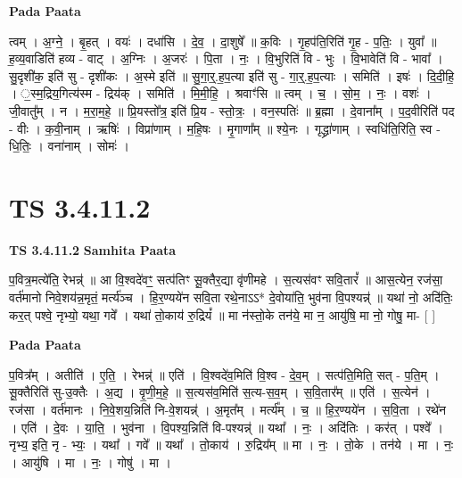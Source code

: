 \documentclass[17pt]{extarticle}
\begin{document}
\textbf{Pada Paata} \newline

त्वम् । अ॒ग्ने॒ । बृ॒हत् । वयः॑ । दधा॑सि । दे॒व॒ । दा॒शुषे᳚ ॥ क॒विः । गृ॒हप॑ति॒रिति॑ गृ॒ह - प॒तिः॒ । युवा᳚ ॥ ह॒व्य॒वाडिति॑ हव्य - वाट् । अ॒ग्निः । अ॒जरः॑ । पि॒ता । नः॒ । वि॒भुरिति॑ वि - भुः । वि॒भावेति॑ वि - भावा᳚ । सु॒दृशी॑क॒ इति॑ सु - दृशी॑कः । अ॒स्मे इति॑ ॥ सु॒गा॒र्॒.ह॒प॒त्या इति॑ सु - गा॒र्॒.ह॒प॒त्याः । समिति॑ । इषः॑ । दि॒दी॒हि॒ । ॒स्म॒द्रिय॒गित्य॑स्म - द्रिय॑क् । समिति॑ । मि॒मी॒हि॒ । श्रवाꣳ॑सि ॥ त्वम् । च॒ । सो॒म॒ । नः॒ । वशः॑ । जी॒वातु᳚म् । न । म॒रा॒म॒हे॒ ॥ प्रि॒यस्तो᳚त्र॒ इति॑ प्रि॒य - स्तो॒त्रः॒ । वन॒स्पतिः॑ ॥ ब्र॒ह्मा । दे॒वाना᳚म् । प॒द॒वीरिति॑ पद - वीः । क॒वी॒नाम् । ऋषिः॑ । विप्रा॑णाम् । म॒हि॒षः । मृ॒गाणा᳚म् ॥ श्ये॒नः । गृद्ध्रा॑णाम् । स्वधि॑ति॒रिति॒ स्व - धि॒तिः॒ । वना॑नाम् । सोमः॑ ।  \newline





\section{ TS 3.4.11.2 }

\textbf{TS 3.4.11.2 } \newline
\textbf{Samhita Paata} \newline

प॒वित्र॒मत्ये॑ति॒ रेभन्न्॑ ॥ आ वि॒श्वदे॑वꣳ॒॒ सत्प॑तिꣳ सू॒क्तैर॒द्या वृ॑णीमहे । स॒त्यस॑वꣳ सवि॒तारं᳚ ॥ आस॒त्येन॒ रज॑सा॒ वर्त॑मानो निवे॒शय॑न्न॒मृतं॒ मर्त्य॑ञ्च । हि॒र॒ण्यये॑न सवि॒ता रथे॒नाऽऽ* दे॒वोया॑ति॒ भुव॑ना वि॒पश्यन्न्॑ ॥ यथा॑ नो॒ अदि॑तिः॒ कर॒त् पश्वे॒ नृभ्यो॒ यथा॒ गवे᳚ । यथा॑ तो॒काय॑ रु॒द्रियं᳚ ॥ मा न॑स्तो॒के तन॑ये॒ मा न॒ आयु॑षि॒ मा नो॒ गोषु॒ मा- [  ] \newline

\textbf{Pada Paata} \newline

प॒वित्र᳚म् । अतीति॑ । ए॒ति॒ । रेभन्न्॑ ॥ एति॑ । वि॒श्वदे॑व॒मिति॑ वि॒श्व - दे॒व॒म् । सत्प॑ति॒मिति॒ सत् - प॒ति॒म् । सू॒क्तैरिति॑ सु-उ॒क्तैः । अ॒द्य । वृ॒णी॒म॒हे॒ ॥ स॒त्यस॑व॒मिति॑ स॒त्य-स॒व॒म् । स॒वि॒तार᳚म् ॥ एति॑ । स॒त्येन॑ । रज॑सा । वर्त॑मानः । नि॒वे॒शय॒न्निति॑ नि-वे॒शयन्न्॑ । अ॒मृत᳚म् । मर्त्य᳚म् । च॒ ॥ हि॒र॒ण्यये॑न । स॒वि॒ता । रथे॑न । एति॑ । दे॒वः । या॒ति॒ । भुव॑ना । वि॒पश्य॒न्निति॑ वि-पश्यन्न्॑ ॥ यथा᳚ । नः॒ । अदि॑तिः । कर॑त् । पश्वे᳚ । नृभ्य॒ इति॒ नृ - भ्यः॒ । यथा᳚ । गवे᳚ ॥ यथा᳚ । तो॒काय॑ । रु॒द्रिय᳚म् ॥ मा । नः॒ । तो॒के । तन॑ये । मा । नः॒ । आयु॑षि । मा । नः॒ । गोषु॑ । मा ।  \newline
\end{document}
